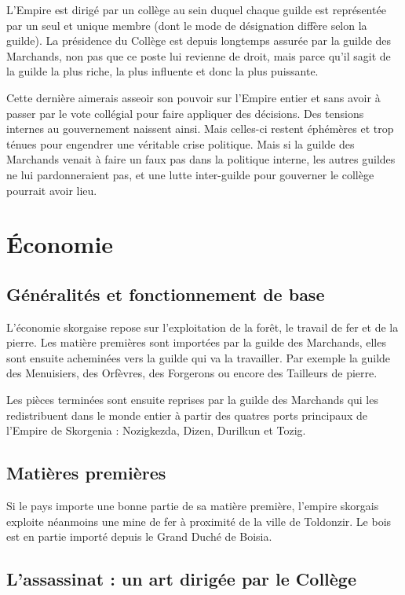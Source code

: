 \documentclass[french, a4paper, 12pt]{article}
\begin{document}
L'Empire est dirigé par un collège au sein duquel chaque guilde est représentée par un seul et unique membre (dont le mode de désignation diffère selon la guilde). La présidence du Collège est depuis longtemps assurée par la guilde des Marchands, non pas que ce poste lui revienne de droit, mais parce qu'il sagit de la guilde la plus riche, la plus influente et donc la plus puissante.

Cette dernière aimerais asseoir son pouvoir sur l'Empire entier et sans avoir à passer par le vote collégial pour faire appliquer des décisions. Des tensions internes au gouvernement naissent ainsi. Mais celles-ci restent éphémères et trop ténues pour engendrer une véritable crise politique. Mais si la guilde des Marchands venait à faire un faux pas dans la politique interne, les autres guildes ne lui pardonneraient pas, et une lutte inter-guilde pour gouverner le collège pourrait avoir lieu.

\section{Économie}

\subsection{Généralités et fonctionnement de base}

L'économie skorgaise repose sur l'exploitation de la forêt, le travail de fer et de la pierre. Les matière premières sont importées par la guilde des Marchands, elles sont ensuite acheminées vers la guilde qui va la travailler. Par exemple la guilde des Menuisiers, des Orfèvres, des Forgerons ou encore des Tailleurs de pierre.

Les pièces terminées sont ensuite reprises par la guilde des Marchands qui les redistribuent dans le monde entier à partir des quatres ports principaux de l'Empire de Skorgenia : Nozigkezda, Dizen, Durilkun et Tozig.

\subsection{Matières premières}

Si le pays importe une bonne partie de sa matière première, l'empire skorgais exploite néanmoins une mine de fer à proximité de la ville de Toldonzir. Le bois est en partie importé depuis le Grand Duché de Boisia.

\subsection{L'assassinat : un art dirigée par le Collège}
\end{document}
